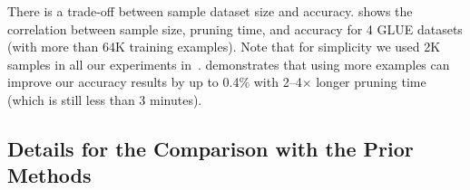 There is a trade-off between sample dataset size and accuracy.
 shows the correlation between sample size, pruning time, and accuracy for 4 GLUE datasets (with more than 64K training examples).
Note that for simplicity we used 2K samples in all our experiments in~.
 demonstrates that using more examples can improve our accuracy results by up to 0.4$\%$ with 2--4$\times$ longer pruning time (which is still less than 3 minutes).

\subsection{\textbf{Details for the Comparison with the Prior Methods}}
\label{appendix:comparison_details}

